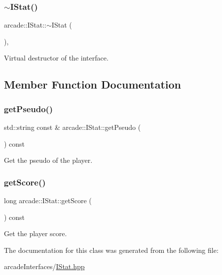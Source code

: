 \subsubsection{\texorpdfstring{$\sim$\+I\+Stat()}{~IStat()}}
{\footnotesize\ttfamily arcade\+::\+I\+Stat\+::$\sim$\+I\+Stat (\begin{DoxyParamCaption}{ }\end{DoxyParamCaption})\hspace{0.3cm}{\ttfamily [inline]}, {\ttfamily [virtual]}}



Virtual destructor of the interface. 



\subsection{Member Function Documentation}
\mbox{\label{classarcade_1_1_i_stat_a6418289d2ae6b3d477ab8a9629487f18}} 
\subsubsection{\texorpdfstring{get\+Pseudo()}{getPseudo()}}
{\footnotesize\ttfamily std\+::string const  \& arcade\+::\+I\+Stat\+::get\+Pseudo (\begin{DoxyParamCaption}{ }\end{DoxyParamCaption}) const\hspace{0.3cm}{\ttfamily [pure virtual]}}



Get the pseudo of the player. 

\mbox{\label{classarcade_1_1_i_stat_acda674f38783f8d12db43103655642b7}} 
\subsubsection{\texorpdfstring{get\+Score()}{getScore()}}
{\footnotesize\ttfamily long arcade\+::\+I\+Stat\+::get\+Score (\begin{DoxyParamCaption}{ }\end{DoxyParamCaption}) const\hspace{0.3cm}{\ttfamily [pure virtual]}}



Get the player score. 



The documentation for this class was generated from the following file\+:\begin{DoxyCompactItemize}
\item 
arcade\+Interfaces/\hyperlink{_i_stat_8hpp}{I\+Stat.\+hpp}\end{DoxyCompactItemize}
